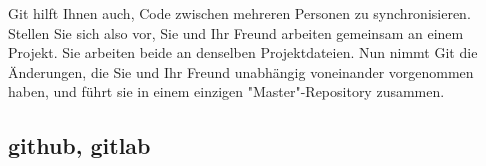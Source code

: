  Git hilft Ihnen auch, Code zwischen mehreren Personen zu synchronisieren. Stellen Sie sich also vor, Sie und Ihr Freund arbeiten gemeinsam an einem Projekt. Sie arbeiten beide an denselben Projektdateien. Nun nimmt Git die Änderungen, die Sie und Ihr Freund unabhängig voneinander vorgenommen haben, und führt sie in einem einzigen "Master"-Repository zusammen.\\


\subsection{github, gitlab}
